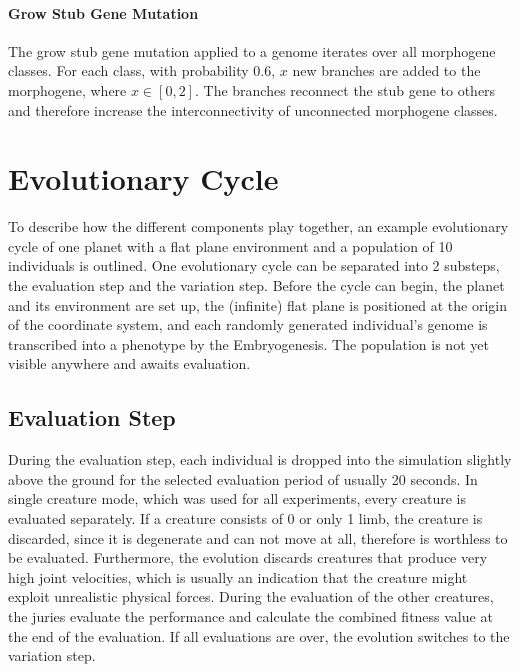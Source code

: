 \documentclass[main]{subfiles}
\begin{document}
\paragraph{Grow Stub Gene Mutation}

The grow stub gene mutation applied to a genome iterates over all morphogene classes. %
%
For each class, with probability $0.6$, $x$ new branches are added to the morphogene, where $x \in [0,2]$. %
%
The branches reconnect the stub gene to others and therefore increase the interconnectivity of unconnected morphogene classes.

\section{Evolutionary Cycle}

To describe how the different components play together, an example evolutionary cycle of one planet with a flat plane environment and a population of 10 individuals is outlined. %
%
One evolutionary cycle can be separated into 2 substeps, the evaluation step and the variation step. %
%
Before the cycle can begin, the planet and its environment are set up, the (infinite) flat plane is positioned at the origin of the coordinate system, and each randomly generated individual's genome is transcribed into a phenotype by the Embryogenesis. %
%
The population is not yet visible anywhere and awaits evaluation.

\subsection{Evaluation Step}

During the evaluation step, each individual is dropped into the simulation slightly above the ground for the selected evaluation period of usually 20 seconds. %
%
In single creature mode, which was used for all experiments, every creature is evaluated separately. %
%
If a creature consists of 0 or only 1 limb, the creature is discarded, since it is degenerate and can not move at all, therefore is worthless to be evaluated. %
%
Furthermore, the evolution discards creatures that produce very high joint velocities, which is usually an indication that the creature might exploit unrealistic physical forces. %
%
During the evaluation of the other creatures, the juries evaluate the performance and calculate the combined fitness value at the end of the evaluation. %
%
If all evaluations are over, the evolution switches to the variation step.
\end{document}

